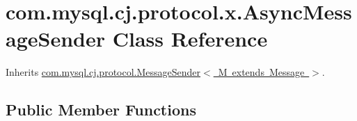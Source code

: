 \hypertarget{classcom_1_1mysql_1_1cj_1_1protocol_1_1x_1_1_async_message_sender}{}\section{com.\+mysql.\+cj.\+protocol.\+x.\+Async\+Message\+Sender Class Reference}
\label{classcom_1_1mysql_1_1cj_1_1protocol_1_1x_1_1_async_message_sender}


Inherits \mbox{\hyperlink{interfacecom_1_1mysql_1_1cj_1_1protocol_1_1_message_sender}{com.\+mysql.\+cj.\+protocol.\+Message\+Sender$<$ M extends Message $>$}}.

\subsection*{Public Member Functions}
